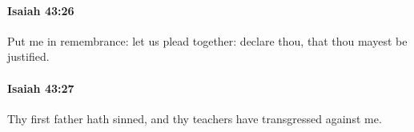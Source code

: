 		\paragraph{Isaiah 43:26} %
			\label{ISAIAH-43-26}

			Put me in remembrance: let us plead together: declare thou, that thou mayest be justified.


		\paragraph{Isaiah 43:27} %
			\label{ISAIAH-43-27}

			Thy first father hath sinned, and thy teachers have transgressed against me.


